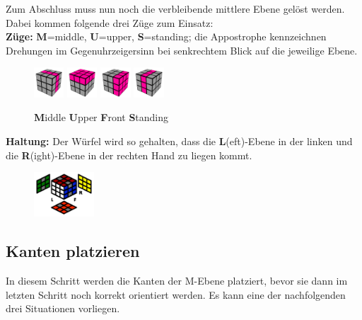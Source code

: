 \documentclass[letterpaper,10pt,twoside,twocolumn,openany]{book}
\begin{document}
\begin{justify}
Zum Abschluss muss nun noch die verbleibende mittlere Ebene gelöst werden. Dabei kommen folgende drei Züge zum Einsatz:\\

\noindent \textbf{Züge:} \textbf{M}=middle, \textbf{U}=upper, \textbf{S}=standing; die Appostrophe kennzeichnen Drehungen im Gegenuhrzeigersinn bei senkrechtem Blick auf die jeweilige Ebene.

\begin{figure}[!htb] 
    \centering
    \includegraphics[width=0.1\textwidth]{img/draw_m.png}
    \includegraphics[width=0.1\textwidth]{img/draw_u.png}
    \includegraphics[width=0.1\textwidth]{img/draw_r.png}
    \includegraphics[width=0.1\textwidth]{img/draw_s.png}
    \caption*{\textbf{M}iddle \kern 17pt \textbf{U}pper \kern 13pt \textbf{F}ront \kern 17pt \textbf{S}tanding}
\end{figure}

\noindent \textbf{Haltung:} Der Würfel wird so gehalten, dass die \textbf{L}(eft)-Ebene in der linken und die \textbf{R}(ight)-Ebene in der rechten Hand zu liegen kommt.

\begin{figure}[!htb] 
  \centering
     \includegraphics[width=0.20\textwidth]{img/center_demo.png}
\end{figure}
\end{justify}

\subsection{Kanten platzieren}
\begin{justify}
In diesem Schritt werden die Kanten der M-Ebene platziert, bevor sie dann im letzten Schritt noch korrekt orientiert werden. Es kann eine der nachfolgenden drei Situationen vorliegen.
\end{justify}
\end{document}
